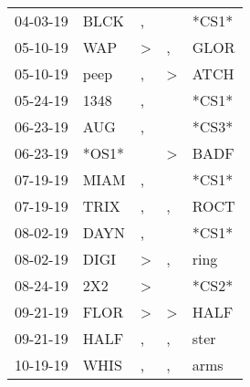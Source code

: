\begin{supertabular}{p{0.07\textwidth}p{0.06\textwidth}p{0.02\textwidth}p{0.02\textwidth}p{0.06\textwidth}}
          04-03-19\textsuperscript{} &           BLCK\textsuperscript{} &                , &                  &                            *CS1* \\
          05-10-19\textsuperscript{} &            WAP\textsuperscript{} &     \textgreater &                , &           GLOR\textsuperscript{} \\
          05-10-19\textsuperscript{} &           peep\textsuperscript{} &                , &     \textgreater &           ATCH\textsuperscript{} \\
          05-24-19\textsuperscript{} &           1348\textsuperscript{} &                , &                  &                            *CS1* \\
          06-23-19\textsuperscript{} &            AUG\textsuperscript{} &                , &                  &                            *CS3* \\
          06-23-19\textsuperscript{} &                            *OS1* &                  &     \textgreater &           BADF\textsuperscript{} \\
          07-19-19\textsuperscript{} &           MIAM\textsuperscript{} &                , &                  &                            *CS1* \\
          07-19-19\textsuperscript{} &           TRIX\textsuperscript{} &                , &                , &           ROCT\textsuperscript{} \\
          08-02-19\textsuperscript{} &           DAYN\textsuperscript{} &                , &                  &                            *CS1* \\
          08-02-19\textsuperscript{} &           DIGI\textsuperscript{} &     \textgreater &                , &           ring\textsuperscript{} \\
          08-24-19\textsuperscript{} &            2X2\textsuperscript{} &     \textgreater &                  &                            *CS2* \\
          09-21-19\textsuperscript{} &           FLOR\textsuperscript{} &     \textgreater &     \textgreater &           HALF\textsuperscript{} \\
          09-21-19\textsuperscript{} &           HALF\textsuperscript{} &                , &                , &           ster\textsuperscript{} \\
          10-19-19\textsuperscript{} &           WHIS\textsuperscript{} &                , &                , &           arms\textsuperscript{} \\

\end{supertabular}
